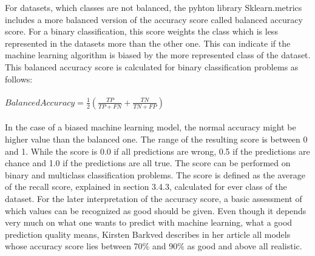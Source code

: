 \documentclass[../masterarbeit.tex]{subfiles}
\begin{document}
For datasets, which classes are not balanced, the pyhton library Sklearn.metrics includes a more balanced version of the accuracy score called balanced accuracy score. For a binary classification, this score weights the class which is less represented in the datasets more than the other one. This can indicate if the machine learning algorithm is biased by the more represented class of the dataset. \autocites{Scikit-model-evaluation:2022}
This balanced accuracy score is calculated for binary classification problems as follows: \\~\\
\(Balanced Accuracy = \frac{1}{2}(\frac{TP}{TP + FN} + \frac{TN}{TN + FP}) \) \hfill \textcite[]{Scikit-model-evaluation:2022} \\~\\
In the case of a biased machine learning model, the normal accuracy might be higher value than the balanced one. The range of the resulting score is between 0 and 1. While the score is 0.0 if all predictions are wrong, 0.5 if the predictions are chance and 1.0 if the predictions are all true. The score can be performed on binary and multiclass classification problems. The score is defined as the average of the recall score, explained in section 3.4.3, calculated for ever class of the dataset.\autocites{Scikit-model-evaluation:2022}
For the later interpretation of the accuracy score, a basic assessment of which values can be recognized as good should be given. Even though it depends very much on what one wants to predict with machine learning, what a good prediction quality means, Kirsten Barkved \textcite[]{obviously.ai:2022} describes in her article all models whose accuracy score lies between 70\% and 90\% as good and above all realistic.
\end{document}
